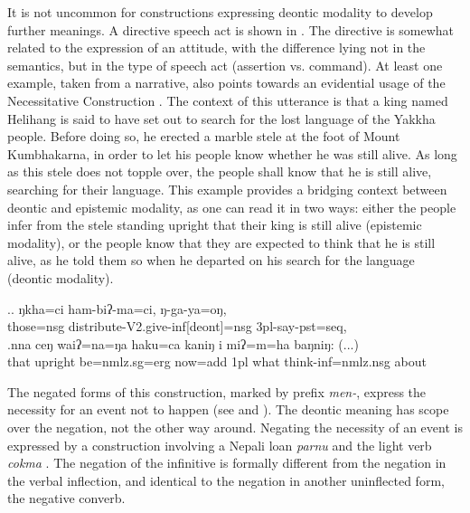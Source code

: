 	
It is not uncommon for constructions expressing deontic modality to develop further meanings. A directive speech act is shown in  \Next[a]. The directive is somewhat related to the expression of an attitude, with the difference lying not in the semantics, but in the type of speech act (assertion vs. command). At least one example, taken from a narrative, also points towards an evidential usage of the Necessitative Construction \Next[b]. The context of this utterance is that a king named Helihang is said to have set out to search for the lost language of the Yakkha people. Before doing so, he erected a marble stele at the foot of Mount Kumbhakarna, in order to let his people know whether he was still alive. As long as this stele does not topple over, the people shall know that he is still alive, searching for their language. This example provides a bridging context between deontic and epistemic modality, as one can read it in two ways: either the people infer from the stele standing upright that their king is still alive (epistemic modality), or the people know that they are expected to think that he is still alive, as he told them so when he departed on his search for the language (deontic modality). 


\ex.\ag. ŋkha=ci ham-biʔ-ma=ci,  ŋ-ga-ya=oŋ,\\
those{\sc =nsg} distribute{\sc -V2.give-inf[deont]=nsg} {\sc 3pl-}say{\sc -pst=seq}, \\
\bg.nna  ceŋ    waiʔ=na=ŋa      haku=ca   kaniŋ i    miʔ=m=ha baŋniŋ: (...)\\
that upright be{\sc [3sg]=nmlz.sg=erg} now{\sc =add} {\sc 1pl} what think{\sc -inf=nmlz.nsg} about\\
 


The negated forms of this construction, marked by prefix \emph{men-}, express the necessity for an event not to happen (see \Next[a] and \Next[b]). The deontic meaning has scope over the negation, not the other  way around. Negating  the  necessity of an event is expressed by a construction involving a Nepali loan \emph{parnu}  and the light verb \emph{cokma}  \Next[c].  The negation of the infinitive is formally different from the negation in the verbal inflection, and identical to the negation in another uninflected form, the negative converb.

